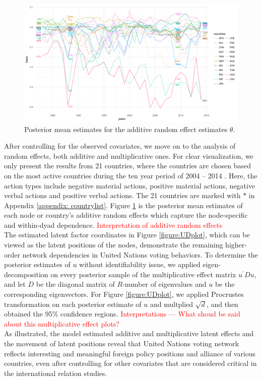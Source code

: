 \documentclass[a4paper]{article}
\begin{document}
 \begin{figure}[ht]
 	\begin{center}
 		\includegraphics[width=1\textwidth]{plots_paper/thetaplot-1.png}	
 	\end{center}
 	\caption {Posterior mean estimates for the additive random effect estimates $\theta$.}
 	\label{figure:thetaplot}
 \end{figure}
 \newline\noindent After controlling for the observed covariates, we move on to the analysis of random effects, both additive and multiplicative ones. For clear visualization, we only present the results from 21 countries, where the countries are chosen based on the most active countries during the ten year period of 2004 -- 2014 \citep{hoff2015multilinear}. Here, the action types include negative material actions, positive material actions, negative verbal actions and positive verbal actions. The 21 countries are marked with $*$ in Appendix \ref{appendix: countrylist}. Figure \ref{figure:thetaplot} is the posterior mean estimates of each node or country's additive random effects which capture the node-specific and within-dyad dependence. \textcolor{red}{Interpretation of additive random effects}\\ \newpage
\noindent The estimated latent factor coordinates in Figure \ref{figure:UDplot}, which can be viewed as the latent positions of the nodes, demonstrate the remaining higher-order network dependencies in United Nations voting behaviors. To determine the posterior estimates of $u$ without identifiability issue, we applied eigen-decomposition on every posterior sample of the multiplicative effect matrix $u^\prime Du$, and let $D$ be the diagonal matrix of $R$-number of eigenvalues and $u$ be the corresponding eigenvectors. For Figure \ref{figure:UDplot}, we applied Procrustes transformation on each posterior estimate of $u$ and multplied $\sqrt{d}$, and then obtained the 95\% confidence regions. \textcolor{red}{Interpretations --- What shoud be said about this multiplicative effect plots?} \\ \newline As illustrated, the model estimated additive and multiplicative latent effects and the movement of latent positions reveal that United Nations voting network reflects interesting and meaningful foreign policy positions and alliance of various countries, even after controlling for other covariates that are considered critical in the international relation studies.
\end{document}
